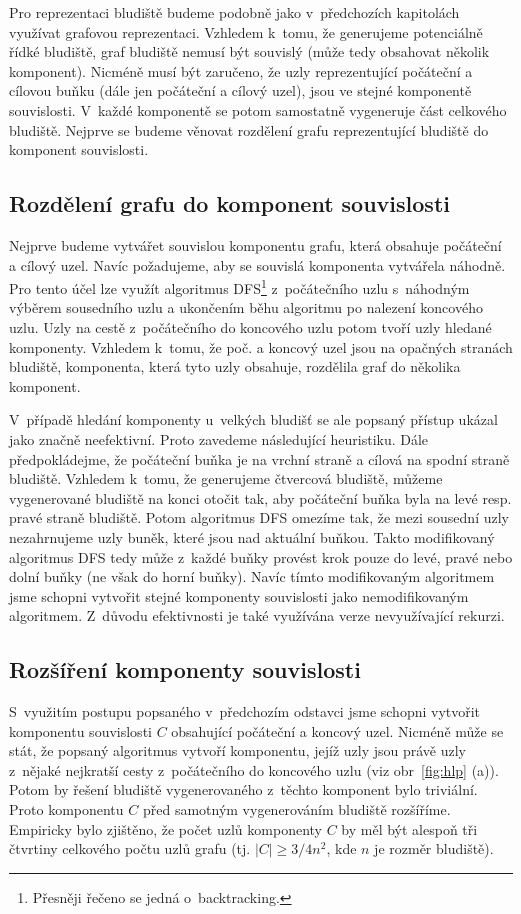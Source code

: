 \documentclass[a4paper,12pt]{article}
\begin{document}
Pro reprezentaci bludiště budeme podobně jako v~předchozích kapitolách využívat grafovou reprezentaci. Vzhledem k~tomu, že
generujeme potenciálně řídké bludiště, graf bludiště nemusí být souvislý (může tedy obsahovat několik komponent).
Nicméně musí být zaručeno, že uzly reprezentující počáteční a cílovou buňku (dále jen počáteční a cílový uzel), jsou 
ve stejné komponentě souvislosti. V~každé komponentě se potom samostatně vygeneruje část celkového bludiště. Nejprve
se budeme věnovat rozdělení grafu reprezentující bludiště do komponent souvislosti.

\subsection{Rozdělení grafu do komponent souvislosti}
Nejprve budeme vytvářet souvislou komponentu grafu, která obsahuje počáteční a cílový uzel. Navíc požadujeme, aby 
se souvislá komponenta vytvářela náhodně. Pro tento účel lze 
využít algoritmus DFS\footnote{Přesněji řečeno se jedná o~backtracking.} z~počátečního uzlu s~náhodným výběrem sousedního 
uzlu a ukončením běhu algoritmu po nalezení koncového uzlu. Uzly na cestě z~počátečního do koncového uzlu 
potom tvoří uzly hledané komponenty. Vzhledem k~tomu, že poč. a koncový uzel jsou na opačných stranách bludiště,
komponenta, která tyto uzly obsahuje, rozdělila graf do několika komponent.

V~případě hledání komponenty u~velkých bludišť se ale popsaný přístup ukázal jako
značně neefektivní. Proto zavedeme následující heuristiku. Dále předpokládejme, že počáteční buňka je na vrchní straně
a cílová na spodní straně bludiště. Vzhledem k~tomu, že generujeme čtvercová bludiště, můžeme vygenerované bludiště
na konci otočit tak, aby počáteční buňka byla na levé resp. pravé straně bludiště. Potom algoritmus DFS omezíme
tak, že mezi sousední uzly nezahrnujeme uzly buněk, které jsou nad aktuální buňkou. Takto modifikovaný algoritmus DFS
tedy může z~každé buňky provést krok pouze do levé, pravé nebo dolní buňky (ne však do horní buňky). Navíc tímto modifikovaným 
algoritmem jsme schopni vytvořit stejné komponenty souvislosti jako nemodifikovaným algoritmem. Z~důvodu efektivnosti
je také využívána verze nevyužívající rekurzi.

\subsection{Rozšíření komponenty souvislosti}
\enlargethispage*{2em}

S~využitím postupu popsaného v~předchozím odstavci jsme schopni vytvořit komponentu souvislosti $C$ obsahující počáteční a koncový uzel.
Nicméně může se stát, že popsaný algoritmus vytvoří komponentu, jejíž uzly jsou právě uzly z~nějaké nejkratší cesty z~počátečního do 
koncového uzlu (viz obr~\ref{fig:hlp} (a)). Potom by řešení bludiště vygenerovaného z~těchto komponent bylo triviální. Proto komponentu $C$ před samotným 
vygenerováním bludiště rozšíříme. Empiricky bylo zjištěno, že počet uzlů komponenty $C$ by měl být alespoň tři čtvrtiny celkového počtu 
uzlů grafu (tj. $|C| \geq 3/4n^2$, kde $n$ je rozměr bludiště).
\end{document}
